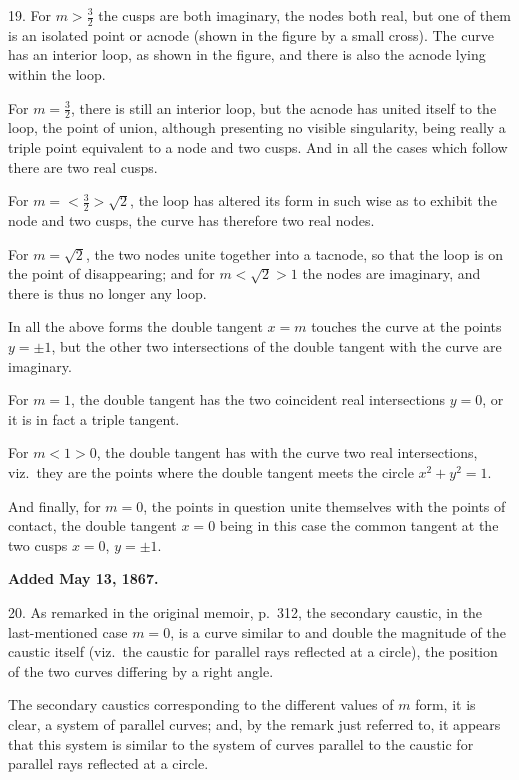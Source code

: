 \documentclass[11pt,a4paper]{article}
\theoremstyle{plain}
\begin{document}
19. For $m > \frac32$ the cusps are both imaginary, the nodes both real, but one of them is an isolated point or acnode (shown in the figure by a small cross). The curve has an interior loop, as shown in the figure, and there is also the acnode lying within the loop.

For $m = \frac32$, there is still an interior loop, but the acnode has united itself to the loop, the point of union, although presenting no visible singularity, being really a triple point equivalent to a node and two cusps. And in all the cases which follow there are two real cusps.

For $m = < \tfrac32 > \sqrt2$, the loop has altered its form in such wise as
to exhibit the node and two cusps, the curve has therefore two real nodes.

For $m = \sqrt{2}$, the two nodes unite together into a tacnode, so that the loop is on the point of disappearing; and for $m < \sqrt{2} > 1$ the nodes are imaginary, and there is thus no longer any loop.

In all the above forms the double tangent $x = m$ touches the curve at the points $y = \pm 1$, but the other two intersections of the double tangent with the curve are imaginary.

For $m = 1$, the double tangent has the two coincident real intersections $y = 0$, or it is in fact a triple tangent.

For $m < 1 > 0$, the double tangent has with the curve two real intersections, viz.\ they are the points where the double tangent meets the circle $x^2 + y^2 = 1$.

And finally, for $m = 0$, the points in question unite themselves with the points of contact, the double tangent $x = 0$ being in this case the common tangent at the two cusps $x = 0$, $y = \pm 1$.

\smallskip

\textbf{Added May 13, 1867.}

20. As remarked in the original memoir, p.~312, the secondary caustic, in the last-mentioned case $m = 0$, is a curve similar to and double the magnitude of the caustic itself (viz.\ the caustic for parallel rays reflected at a circle), the position of the two curves differing by a right angle.

The secondary caustics corresponding to the different values of $m$ form, it is clear, a system of parallel curves; and, by the remark just referred to, it appears that this system is similar to the system of curves parallel to the caustic for parallel rays reflected at a circle.
\end{document}
